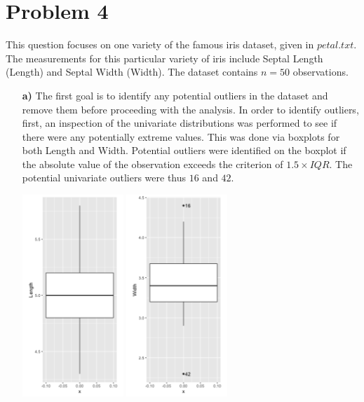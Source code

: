 \newpage
\section*{Problem 4}
This question focuses on one variety of the famous iris dataset, given in $petal.txt$. The measurements for this particular variety of iris include Septal Length (Length) and Septal Width (Width). The dataset contains $n = 50$ observations.

\begin{enumerate}
\item[\bf{a)}] 
	The first goal is to identify any potential outliers in the dataset and remove them before proceeding with the analysis. In order to identify outliers, first, an inspection of the univariate distributions was performed to see if there were any potentially extreme values. This was done via boxplots for both Length and Width. Potential outliers were identified on the boxplot if the absolute value of the observation exceeds the criterion of $1.5 \times IQR$. The potential univariate outliers were thus $16$ and $42$.
	\begin{center}
		\includegraphics[width=1.5in]{plot_4_a_L_boxplot.png}
		\includegraphics[width=1.5in]{plot_4_a_W_boxplot.png}

\end{center}
\end{enumerate}
